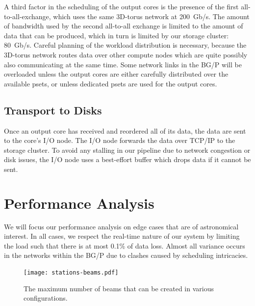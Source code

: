 \documentclass{llncs}
\begin{document}
A third factor in the scheduling of the output cores is the presence of the first all-to-all-exchange, which uses the same 3D-torus network at 200~Gb/s. The amount of bandwidth used by the second all-to-all exchange is limited to the amount of data that can be produced, which in turn is limited by our storage cluster: 80~Gb/s. Careful planning of the workload distribution is necessary, because the 3D-torus network routes data over other compute nodes which are quite possibly also communicating at the same time. Some network links in the BG/P will be overloaded unless the output cores are either carefully distributed over the available psets, or unless dedicated psets are used for the output cores. 

\subsection{Transport to Disks}
Once an output core has received and reordered all of its data, the data are sent to the core's I/O node. The I/O node forwards the data over TCP/IP to the storage cluster. To avoid any stalling in our pipeline due to network congestion or disk issues, the I/O node uses a best-effort buffer which drops data if it cannot be sent.


\section{Performance Analysis}

We will focus our performance analysis on edge cases that are of astronomical interest. In all cases, we respect the real-time nature of our system by limiting the load such that there is at most 0.1\% of data loss. Almost all variance occurs in the networks within the BG/P due to clashes caused by scheduling intricacies.

\begin{figure}[ht]
\texttt{[image: stations-beams.pdf]}
\label{fig:stations-beams}
\caption{The maximum number of beams that can be created in various configurations.}
\end{figure}
\end{document}
